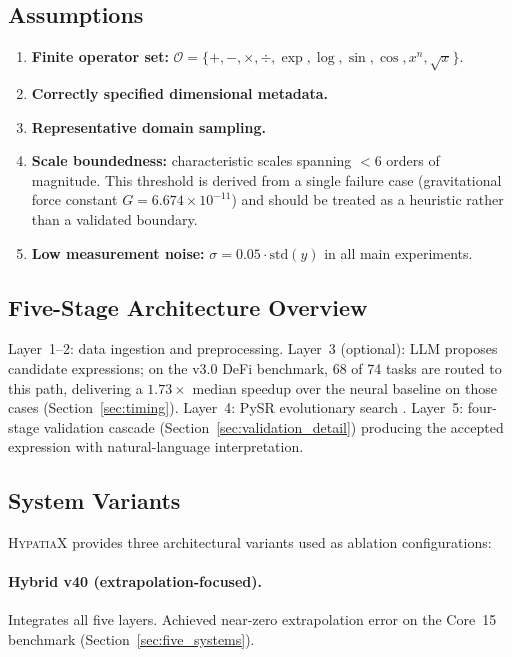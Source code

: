 \documentclass[twoside,11pt]{article}
\begin{document}
\subsection{Assumptions}
\label{sec:assumptions}

\begin{enumerate}
\item \textbf{Finite operator set:}
  $\mathcal{O} = \{+,-,\times,\div,\exp,\log,\sin,\cos,x^n,\sqrt{x}\}$.
\item \textbf{Correctly specified dimensional metadata.}
\item \textbf{Representative domain sampling.}
\item \textbf{Scale boundedness:} characteristic scales spanning
  $<6$ orders of magnitude.
  This threshold is derived from a single failure case (gravitational force
  constant $G = 6.674 \times 10^{-11}$) and should be treated as a heuristic
  rather than a validated boundary.
\item \textbf{Low measurement noise:}
  $\sigma = 0.05 \cdot \mathrm{std}(y)$ in all main experiments.
\end{enumerate}

\subsection{Five-Stage Architecture Overview}
\label{sec:validation_framework}

Layer~1--2: data ingestion and preprocessing.
Layer~3 (optional): LLM proposes candidate expressions; on the v3.0 DeFi
benchmark, 68 of 74 tasks are routed to this path, delivering a $1.73\times$
median speedup over the neural baseline on those cases
(Section~\ref{sec:timing}).
Layer~4: PySR evolutionary search \citep{cranmer2023pysr}.
Layer~5: four-stage validation cascade (Section~\ref{sec:validation_detail})
producing the accepted expression with natural-language interpretation.

\subsection{System Variants}

\textsc{HypatiaX} provides three architectural variants used as ablation
configurations:

\paragraph{Hybrid v40 (extrapolation-focused).}
Integrates all five layers.  Achieved near-zero extrapolation error on the
Core~15 benchmark (Section~\ref{sec:five_systems}).
\end{document}
